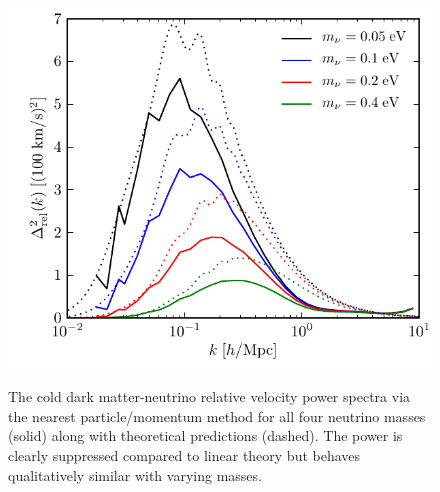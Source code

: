 \begin{figure}[!t]
\begin{center}
\includegraphics[width=\smwidth]{./figures/neutrinos/fig10.pdf} \vspace{-0.1cm}
\caption[Relative velocity power spectra for various neutrino masses]
{The cold dark matter-neutrino relative velocity power
spectra via the nearest particle/momentum method for all
four neutrino masses (solid) along with theoretical
predictions (dashed).  The power is clearly suppressed
compared to linear theory but behaves qualitatively similar
with varying masses.}
\vspace{-0.2cm}
\label{fig:allrelvelpow}
\end{center}
\end{figure}

